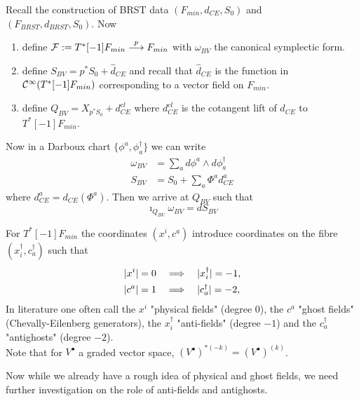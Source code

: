 \begin{example}[BV-BRST]
  Recall the construction of BRST data $(F_{min}, d_{CE}, S_0)$ and\\ $(F_{BRST}, d_{BRST}, S_0)$. Now
  \begin{enumerate}
    \item define ${\mathcal{F}} := T^*[-1]F_{min} \overset{p}{\longrightarrow} F_{min}$ with $\omega_{BV}$ the canonical symplectic form.
    \item define $S_{BV} = p^* S_0 + \widehat{d}_{CE}$ and recall that $\widehat{d}_{CE}$ is the function in $\mathcal{C}^{\infty}(T^*[-1]F_{min})$ corresponding to a vector field on $F_{min}$.
    \item define $Q_{BV} = X_{p^*S_0} + d_{CE}^{cl}$  where $d_{CE}^{cl}$ is the cotangent lift of $d_{CE}$ to $T^*[-1]F_{min}$.
  \end{enumerate}
  Now in a Darboux chart $\{\phi^a, \phi^\dagger_a\}$ we can write
  \begin{align}
    \omega_{BV} &= \sum_a d\phi^a \wedge d\phi^\dagger_a \\
    S_{BV} &= S_0 + \sum_a \Phi^a d^a_{CE}
  \end{align}
  where $d^a_{CE} = d_{CE}(\Phi^a)$. Then we arrive at $Q_{BV}$ such that
  \begin{equation}
    \imath_{Q_{BV}} \omega_{BV} = dS_{BV}
  \end{equation}
\end{example}

\begin{notation}
  For $T^*[-1]F_{min}$ the coordinates $(x^i, c^a)$ introduce coordinates on the fibre $(x^\dagger_i, c^\dagger_a)$ such that
  \begin{align*}
    |x^i| &= 0 \quad \Longrightarrow \quad |x_i^\dagger| = -1, \\
    |c^a| &= 1 \quad \Longrightarrow \quad |c_a^\dagger| = -2,
  \end{align*}
  In literature one often call the $x^i$ "physical fields" (degree $0$), the $c^a$ "ghost fields" (Chevally-Eilenberg generators), the $x_i^\dagger$ "anti-fields" (degree $-1$) and the $c_a^\dagger$ "antighosts" (degree $-2$).\\

  Note that for $V^\bullet$ a graded vector space, $(V^\bullet)^{* (-k)} = (V^\bullet)^{(k)}$.
\end{notation}

Now while we already have a rough idea of physical and ghost fields, we need further investigation on the role of anti-fields and antighosts.


